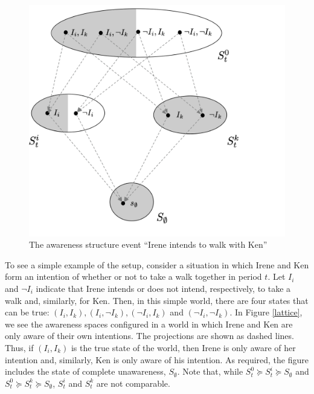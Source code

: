 \documentclass[
11pt,
titlepage,
reqno,
]{article}%
\theoremstyle{definition}
\begin{document}
\begin{figure}[h!]	
	\begin{center}
		\includegraphics[scale=.7]{lattice-event.png}
	\end{center}
\caption{The awareness structure event ``Irene intends to walk with Ken''\label{lattice-event}}
\end{figure}

To see a simple example of the setup, consider a situation in which  Irene and Ken form an intention of whether or not to take a walk together in period $t$. 
Let $I_i$ and $\neg I_i$ indicate that Irene intends or does not intend, respectively, to take a walk and, similarly, for Ken. 
Then, in this simple world, there are four states that can be true: $(I_i,I_k),(I_i,\neg I_k),(\neg I_i,I_k)$ and $(\neg I_i,\neg I_k)$. 
In Figure \ref{lattice}, we see the awareness spaces configured in a world in which Irene and Ken are only aware of their own intentions. 
The projections are shown as dashed lines. 
Thus, if $(I_i,I_k)$ is the true state of the world, then Irene is only aware of her intention and, similarly, Ken is only aware of his intention. 
As required, the figure includes the state of complete unawareness, $S_\emptyset$.
Note that, while $S^0_t\succeq S^i_t\succeq S_\emptyset$ and $S^0_t\succeq S^k_t\succeq S_\emptyset$, $S^i_t$ and $S^k_t$ are not comparable.
\end{document}
